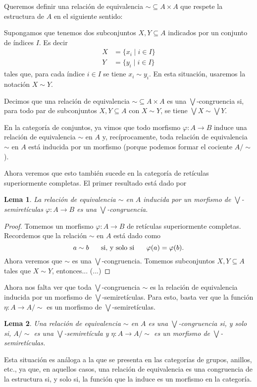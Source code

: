 \documentclass[12pt,letterpaper,titlepage]{article}
\newtheorem*{lemma}{Lema}
\theoremstyle{definition}
\newcommand\Sup{\bigvee}
\renewcommand\phi{\varphi}
\newcommand\simr{{\sim}}
\newcommand\ssi{\hspace{5mm}\text{ si, y solo si }\hspace{5mm}}
\newcommand\<{\langle}
\renewcommand\>{\rangle}
\begin{document}
Queremos definir una relación de equivalencia $\simr\subseteq A\times A$
que respete la estructura de $A$ en el siguiente sentido:

Supongamos que tenemos dos subconjuntos $X,Y\subseteq A$ indicados por un
conjunto de índices $I$.
Es decir
\begin{align*}
    X &= \{x_i \mid i\in I\} \\
    Y &= \{y_i \mid i\in I\}
\end{align*}
tales que, para cada índice $i\in I$ se tiene $x_i\sim y_i$.
En esta situación, usaremos la notación $X\sim Y$.

Decimos que una relación de equivalencia $\simr\subseteq A\times A$ es una
$\Sup$-congruencia si, para todo par de subconjuntos $X,Y\subseteq A$ con
$X\sim Y$, se tiene $\Sup X\sim \Sup Y$.

En la categoría de conjuntos, ya vimos que todo morfismo $\phi:A\to B$
induce una relación de equivalencia $\simr$ en $A$  y, recíprocamente,
toda relación de equivalencia $\simr$ en $A$ está inducida por
un morfismo (porque podemos formar el cociente $A/\simr$).

Ahora veremos que esto también sucede en la categoría de retículas
superiormente completas.
El primer resultado está dado por
\begin{lemma}
    La relación de equivalencia $\simr$ en $A$ inducida por un morfismo
    de $\Sup$-semiretículas $\phi:A\to B$ es una $\Sup$-congruencia.
\end{lemma}
\begin{proof}
    Tomemos un morfismo $\phi:A\to B$  de retículas superiormente completas.
    Recordemos que la relación $\simr$ en $A$ está dado como
    \[
        a\sim b \ssi \phi(a) = \phi(b)
    .\]
    Ahora veremos que $\simr$ es una $\Sup$-congruencia.
    Tomemos subconjuntos $X,Y\subseteq A$ tales que $X\sim Y$,
    entonces... (...)
\end{proof}
Ahora nos falta ver que toda $\Sup$-congruencia $\simr$ es la relación de
equivalencia inducida por un morfismo de $\Sup$-semiretículas.
Para esto, basta ver que la función $\eta:A\to A/\simr$ es un
morfismo de $\Sup$-semiretículas.
\begin{lemma}
    Una relación de equivalencia $\simr$ en $A$ es una $\Sup$-congruencia
    si, y solo si, $A/\simr$ es una $\Sup$-semiretícula y
    $\eta:A\to A/\simr$ es un morfismo de $\Sup$-semiretículas.
\end{lemma}
Esta situación es análoga a la que se presenta en las categorías de grupos,
anillos, etc., ya que, en aquellos casos, una relación de equivalencia es
una congruencia de la estructura si, y solo si, la función que la induce es
un morfismo en la categoría.
\end{document}
